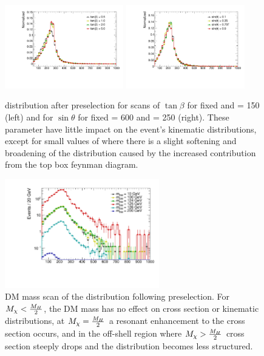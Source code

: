 \begin{figure}
\centering
\includegraphics[width=0.46\textwidth]{texinputs/04_grid/figures/monoz/leptonic/TanbScan_mA600_ma150_MET.pdf} 
\includegraphics[width=0.46\textwidth]{texinputs/04_grid/figures/monoz/leptonic/SinpScan_mA600_ma250_MET.pdf} 
\caption{\MET distribution after preselection for scans of $\tan{\beta}$ for fixed  \GeV and \ma = 150 \GeV (left) and for $\sin{\theta}$ for fixed \mA = 600 \GeV and \ma = 250 \GeV (right).  These parameter have little impact on the event's kinematic distributions, except for small values of \tanb where there is a slight softening and broadening of the \MET distribution caused by the increased contribution from the top box feynman diagram.}
\label{fig:monoz_kin_tanb_sintheta}
\end{figure}


\begin{figure}
\centering
\includegraphics[width=0.6\textwidth]{texinputs/04_grid/figures/monoz/leptonic/mDMScan_mA600_ma250_MET.pdf}
\caption{DM mass scan of the \MET distribution following preselection.  For $M_{\chi} < \frac{M_{H}}{2}$, the DM mass has no effect on cross section or kinematic distributions, at $M_{\chi} = \frac{M_{H}}{2}$ a resonant enhancement to the cross section occurs, and in the off-shell region where  $M_{\chi} > \frac{M_{H}}{2}$ cross section steeply drops and the \MET distribution becomes less structured.}
\label{fig:dm_scan_ll}
\end{figure}



